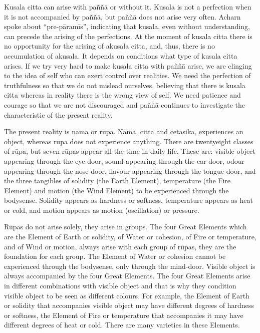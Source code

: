 Kusala citta can arise with paññā or without it. Kusala is not a
perfection when it is not accompanied by paññā, but paññā does not arise
very often. Acharn spoke about ``pre-pāramīs'', indicating that kusala,
even without understanding, can precede the arising of the perfections.
At the moment of kusala citta there is no opportunity for the arising of
akusala citta, and, thus, there is no accumulation of akusala. It
depends on conditions what type of kusala citta arises. If we try very
hard to make kusala citta with paññā arise, we are clinging to the idea
of self who can exert control over realities. We need the perfection of
truthfulness so that we do not mislead ourselves, believing that there
is kusala citta whereas in reality there is the wrong view of self. We
need patience and courage so that we are not discouraged and paññā
continues to investigate the characteristic of the present reality.

The present reality is nāma or rūpa. Nāma, citta and cetasika,
experiences an object, whereas rūpa does not experience anything. There
are twentyeight classes of rūpa, but seven rūpas appear all the time in
daily life. These are: visible object appearing through the eye-door,
sound appearing through the ear-door, odour appearing through the
nose-door, flavour appearing through the tongue-door, and the three
tangibles of solidity (the Earth Element), temperature (the Fire
Element) and motion (the Wind Element) to be experienced through the
bodysense. Solidity appears as hardness or softness, temperature appears
as heat or cold, and motion appears as motion (oscillation) or pressure.

Rūpas do not arise solely, they arise in groups. The four Great Elements
which are the Element of Earth or solidity, of Water or cohesion, of
Fire or temperature, and of Wind or motion, always arise with each group
of rūpas, they are the foundation for each group. The Element of Water
or cohesion cannot be experienced through the bodysense, only through
the mind-door. Visible object is always accompanied by the four Great
Elements. The four Great Elements arise in different combinations with
visible object and that is why they condition visible object to be seen
as different colours. For example, the Element of Earth or solidity that
accompanies visible object may have different degrees of hardness or
softness, the Element of Fire or temperature that accompanies it may
have different degrees of heat or cold. There are many varieties in
these Elements.

